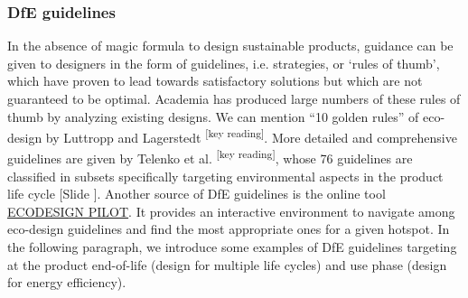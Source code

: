 \documentclass{article}
\newcounter{slide}
\begin{document}
\subsubsection{DfE guidelines}
\label{sec:guidelines}
In the absence of magic formula to design sustainable products, guidance can be given to designers in the form of guidelines, i.e. strategies, or `rules of thumb', which have proven to lead towards satisfactory solutions but which are not guaranteed to be optimal. Academia has produced large numbers of these rules of thumb by analyzing existing designs. We can mention ``10 golden rules'' of eco-design by Luttropp and Lagerstedt \cite{luttroppEcoDesignTenGolden2006a}\textsuperscript{\color{Magenta}[key reading]}. More detailed and comprehensive guidelines are given by Telenko et al. \cite{telenkoCompilationDesignEnvironment2016a}\textsuperscript{\color{Magenta}[key reading]}, whose 76 guidelines are classified in subsets specifically targeting environmental aspects in the product life cycle {\color{blue}[Slide ]}. Another source of DfE guidelines is the online tool \href{http://pilot.ecodesign.at/pilot/ONLINE/ENGLISH/INDEX.HTM}{ECODESIGN PILOT}. It provides an interactive environment to navigate among eco-design guidelines and find the most appropriate ones for a given hotspot. In the following paragraph, we introduce some examples of DfE guidelines targeting at the product end-of-life (design for multiple life cycles) and use phase (design for energy efficiency).
\end{document}
